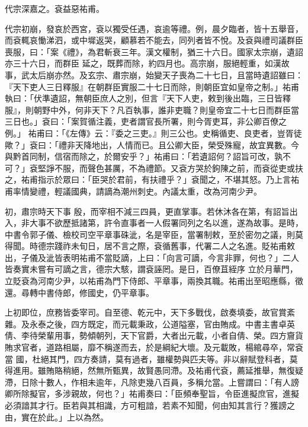 \begin{pinyinscope}
 代宗深嘉之。袞益惡祐甫。



 代宗初崩，發哀於西宮，袞以獨受任遇，哀逾等禮。例，晨夕臨者，皆十五舉音，而袞輒哀慟涕泗，或中墀返哭，顧慕若不能去，同列者皆不悅。及袞與禮司議群臣喪服，曰：「案《禮》，為君斬衰三年。漢文權制，猶三十六日。國家太宗崩，遺詔亦三十六日，而群臣
 延之，既葬而除，約四月也。高宗崩，服絕輕重，如漢故事，武太后崩亦然。及玄宗、肅宗崩，始變天子喪為二十七日，且當時遺詔雖曰：『天下吏人三日釋服』在朝群臣實服二十七日而除，則朝臣宜如皇帝之制。」祐甫執曰：「伏準遺詔，無朝臣庶人之別，但言『天下人吏，敕到後出臨，三日皆釋服』，則朝野中外，何非天下？凡百執事，誰非吏職？則皇帝宜二十七日而群臣當三日也。」袞曰：「案賀循注義，吏者謂官長所署，則今胥吏耳，非公卿百僚之例。」
 祐甫曰：「《左傳》云：『委之三吏。』則三公也。史稱循吏、良吏者，豈胥徒歟？」袞曰：「禮非天降地出，人情而已。且公卿大臣，榮受殊寵，故宜異數。今與黔首同制，信宿而除之，於爾安乎？」祐甫曰：「若遺詔何？詔旨可改，孰不可？」袞堅諍不服，而聲色甚厲，不為禮節。又袞方哭於鉤陳之前，而袞從吏或扶之，祐甫指示於眾曰：「臣哭於君前，有扶禮乎？」袞聞之，不堪其怒。乃上言祐甫率情變禮，輕議國典，請謫為潮州刺史。內議太重，改為河南少尹。



 初，肅宗時天下事
 殷，而宰相不減三四員，更直掌事。若休沐各在第，有詔旨出入，非大事不欲歷抵諸第，許令直事者一人假署同列之名以進，遂為故事。是時，中書令郭子儀、檢校司空平章事硃泚，名是宰臣，當署制敕，至於密勿之議，則莫得聞。時德宗踐祚未旬日，居不言之際，袞循舊事，代署二人之名進。貶祐甫敕出，子儀及泚皆表明祐甫不當貶謫，上曰：「向言可謫，今言非罪，何也？」二人皆奏實未嘗有可謫之言，德宗大駭，謂袞誣罔。是日，百僚苴絰序
 立於月華門，立貶袞為河南少尹，以祐甫為門下侍郎、平章事，兩換其職。祐甫出至昭應縣，徵還。尋轉中書侍郎，修國史，仍平章事。



 上初即位，庶務皆委宰司。自至德、乾元中，天下多戰伐，啟奏填委，故官賞紊雜。及永泰之後，四方既定，而元載秉政，公道隘塞，官由賄成。中書主書卓英倩、李待榮輩用事，勢傾朝列，天下官爵，大者出元載，小者自倩、榮。四方齎貨賄求官者，道路相屬，靡不稱遂而去，於是綱紀大壞。及元載敗，楊綰尋卒，常袞當
 國，杜絕其門，四方奏請，莫有過者，雖權勢與匹夫等。非以辭賦登科者，莫得進用。雖賄賂稍絕，然無所甄異，故賢愚同滯。及祐甫代袞，薦延推舉，無復疑滯，日除十數人，作相未逾年，凡除吏幾八百員，多稱允當。上嘗謂曰：「有人謗卿所除擬官，多涉親故，何也？」祐甫奏曰：「臣頻奉聖旨，令臣進擬庶官，進擬必須諳其才行。臣若與其相識，方可粗諳，若素不知聞，何由知其言行？獲謗之由，實在於此。」上以為然。




\end{pinyinscope}
